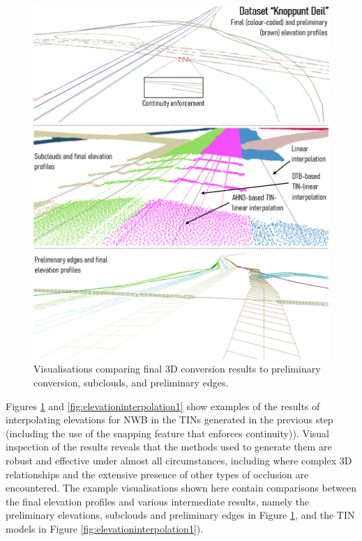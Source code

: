 \begin{figure}
    \centering
    \includegraphics[width=\linewidth]{final_report/figs/elevationinterpolation0.png}
    \caption{Visualisations comparing final 3D conversion results to preliminary conversion, subclouds, and preliminary edges.}
    \label{fig:elevationinterpolation0}
\end{figure}

Figures \ref{fig:elevationinterpolation0} and \ref{fig:elevationinterpolation1} show examples of the results of interpolating elevations for NWB in the TINs generated in the previous step (including the use of the snapping feature that enforces continuity)). Visual inspection of the results reveals that the methods used to generate them are robust and effective under almost all circumstances, including where complex 3D relationships and the extensive presence of other types of occlusion are encountered. The example visualisations shown here contain comparisons between the final elevation profiles and various intermediate results, namely the preliminary elevations, subclouds and preliminary edges in Figure \ref{fig:elevationinterpolation0}, and the TIN models in Figure \ref{fig:elevationinterpolation1}).

